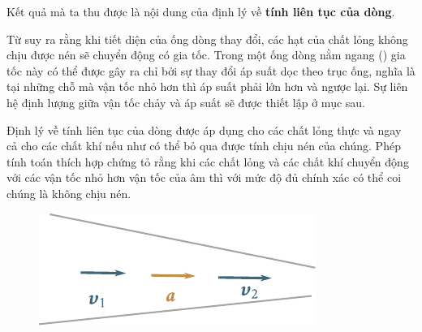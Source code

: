 \noindent

Kết quả mà ta thu được là nội dung của định lý về \textbf{tính liên tục của dòng}.


Từ  suy ra rằng khi tiết diện của ống dòng thay đổi, các hạt của chất lỏng không chịu được nén sẽ chuyển động có gia tốc. Trong một ống dòng nằm ngang () gia tốc này có thể được gây ra chỉ bởi sự thay đổi áp suất dọc theo trục ống, nghĩa là tại những chỗ mà vận tốc nhỏ hơn thì áp suất phải lớn hơn và ngược lại. Sự liên hệ định lượng giữa vận tốc chảy và áp suất sẽ được thiết lập ở mục sau.


Định lý về tính liên tục của dòng được áp dụng cho các chất lỏng thực và ngay cả cho các chất khí nếu như có thể bỏ qua được tính chịu nén của chúng. Phép tính toán thích hợp chứng tỏ rằng khi các chất lỏng và các chất khí chuyển động với các vận tốc nhỏ hơn vận tốc của âm thì với mức độ đủ chính xác có thể coi chúng là không chịu nén.

\begin{figure}[!htb]
	\begin{center}
		\includegraphics[scale=1.0]{figures/ch_09/fig_9_4.pdf}
		\caption[]{}
		\label{fig:9_4}
	\end{center}
	\vspace{-0.8cm}
\end{figure}


